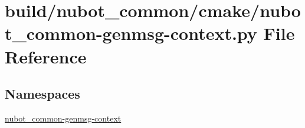 \hypertarget{nubot__common-genmsg-context_8py}{\section{build/nubot\-\_\-common/cmake/nubot\-\_\-common-\/genmsg-\/context.py File Reference}
\label{nubot__common-genmsg-context_8py}
}
\subsection*{Namespaces}
\begin{DoxyCompactItemize}
\item 
\hyperlink{namespacenubot__common-genmsg-context}{nubot\-\_\-common-\/genmsg-\/context}
\end{DoxyCompactItemize}
